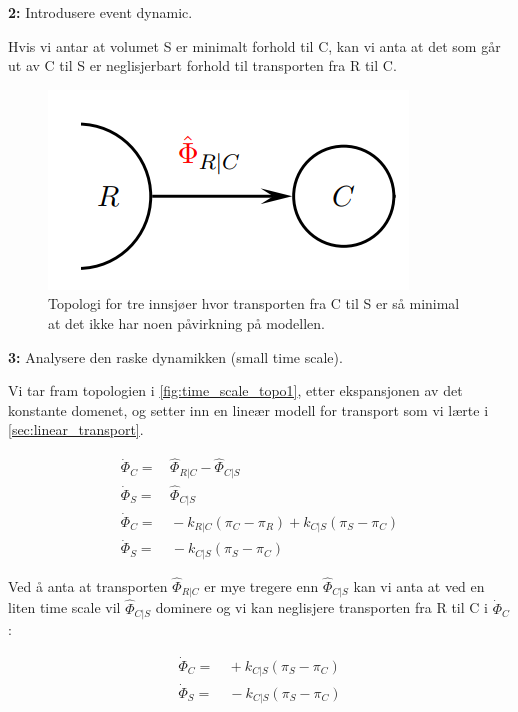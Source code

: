 \begin{center}
    \textbf{2:} Introdusere event dynamic.
\end{center}

Hvis vi antar at volumet S er minimalt forhold til C, kan vi anta at det som går ut av C til S er neglisjerbart forhold til transporten fra R til C.

\begin{figure}[H]
    \centering
    \includegraphics[scale=0.5]{Figures/time_scale_topo2.png}
    \caption{Topologi for tre innsjøer hvor transporten fra C til S er så minimal at det ikke har noen påvirkning på modellen.}
    \label{fig:time_scale_topo2}
\end{figure}



\begin{center}
    \textbf{3:} Analysere den raske dynamikken (small time scale).
\end{center}

Vi tar fram topologien i \cref{fig:time_scale_topo1}, etter ekspansjonen av det konstante domenet, og setter inn en lineær modell for transport som vi lærte i \cref{sec:linear_transport}.

\begin{align}
    \dot{\Phi}_C =&\, \hat{\Phi}_{R|C} - \hat{\Phi}_{C|S}\\
    \dot{\Phi}_S =&\, \hat{\Phi}_{C|S} \\[0.5cm]
    \dot{\Phi}_C =&\, -k_{R|C}(\pi_C-\pi_R) +k_{C|S}(\pi_S-\pi_C)\\
      \dot{\Phi}_S =&\ -k_{C|S}(\pi_S-\pi_C)
\end{align}

Ved å anta at transporten $\hat{\Phi}_{R|C}$ er mye tregere enn  $\hat{\Phi}_{C|S}$ kan vi anta at ved en liten time scale vil $\hat{\Phi}_{C|S}$ dominere og vi kan neglisjere transporten fra R til C i $\dot{\Phi}_C$:

\begin{align}
    \dot{\Phi}_C =&\, +k_{C|S}(\pi_S-\pi_C)\\
      \dot{\Phi}_S =&\ -k_{C|S}(\pi_S-\pi_C)
\end{align}

